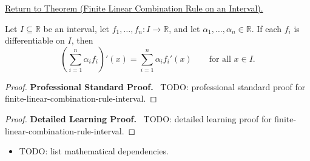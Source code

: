 \newpage
{}
\label{prf:finite-linear-combination-rule-interval}

\begin{remark*}[Return]
\hyperref[thm:finite-linear-combination-rule-interval]{Return to Theorem (Finite Linear Combination Rule on an Interval).}
\end{remark*}

\begin{theorem*}
Let $I \subseteq \mathbb{R}$ be an interval, let $f_1, \dots, f_n : I \to \mathbb{R}$, and let $\alpha_1, \dots, \alpha_n \in \mathbb{R}$. If each $f_i$ is differentiable on $I$, then
\[
\left(\sum_{i=1}^{n} \alpha_i f_i\right)'(x) = \sum_{i=1}^{n} \alpha_i f_i'(x) \qquad \text{for all } x \in I.
\]
\end{theorem*}

\begin{proof}
\textbf{Professional Standard Proof.}~
TODO: professional standard proof for finite-linear-combination-rule-interval.
\end{proof}

\begin{proof}
\textbf{Detailed Learning Proof.}~
TODO: detailed learning proof for finite-linear-combination-rule-interval.
\end{proof}

\begin{remark*}
\end{remark*}

\begin{dependencies}
\begin{itemize}
  \item TODO: list mathematical dependencies.
\end{itemize}
\end{dependencies}

\clearpage
